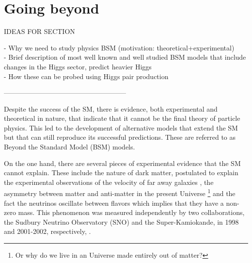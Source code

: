 
\section{Going beyond}
\label{section:BSM}

IDEAS FOR SECTION

- Why we need to study physics BSM (motivation: theoretical+experimental)\\
- Brief description of most well known and well studied BSM models that include changes in the Higgs sector, predict heavier Higgs \\
- How these can be probed using Higgs pair production

------------------------------------------------------

Despite the success of the SM, there is evidence, both experimental and theoretical in nature, that indicate that it cannot be the final theory of particle physics. This led to the development of alternative models that extend the SM but that can still reproduce its successful predictions. These are referred to as Beyond the Standard Model (BSM) models. 

On the one hand, there are several pieces of experimental evidence that the SM cannot explain. These include the nature of dark matter, postulated to explain the experimental observations of the velocity of far away galaxies \cite{DM}, the asymmetry between matter and anti-matter in the present Universe \footnote{Or why do we live in an Universe made entirely out of matter?} and the fact the neutrinos oscillate between flavors which implies that they have a non-zero mass. This phenomenon was measured independently by two collaborations, the Sudbury Neutrino Observatory (SNO) and the Super-Kamiokande, in 1998 and 2001-2002, respectively, \cite{neutrinosSuperK,neutrinosSNO1,neutrinosSNO2}.

